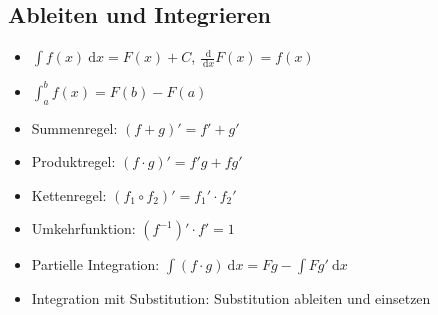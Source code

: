 \documentclass[a4paper,10pt]{article}
\providecommand\d{}
\renewcommand{\d}[1]{\:\mathrm{d}{#1}}
\begin{document}
\begin{multicols}{2}
\section {Ableiten und Integrieren}
\begin{itemize}
\item $\int f(x) \d x = F(x) +C$, $\frac{\d{}}{\d x} F(x) = f(x)$
\item $\int_a^b f(x) = F(b) - F(a)$
\item Summenregel: $(f+g)' = f'+g'$
\item Produktregel: $(f\cdot g)' = f'g+fg'$
\item Kettenregel: $(f_1\circ f_2)' = f_1' \cdot f_2'$
\item Umkehrfunktion: $(f^{-1})' \cdot f' = 1$
\item Partielle Integration: $\int (f \cdot g) \d x = Fg - \int Fg' \d x$
\item Integration mit Substitution: Substitution ableiten und einsetzen
\end{itemize}

\end{multicols}

\newpage
\noindent
\end{document}
